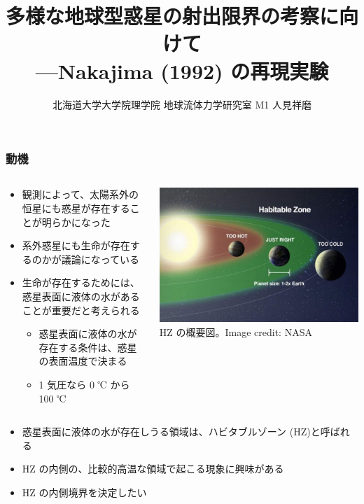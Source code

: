\documentclass[aspectratio=149,9pt]{beamer}
\author{北海道大学大学院理学院 地球流体力学研究室 M1 人見祥磨}
\title{多様な地球型惑星の射出限界の考察に向けて\\---Nakajima \etal (1992) の再現実験}
\begin{document}
\begin{frame}
	\maketitle
\end{frame}

\begin{frame}
	\frametitle{動機}
	\begin{columns}[T,onlytextwidth]
		\begin{column}{.5\textwidth}
			\begin{itemize}
				\item 観測によって、太陽系外の恒星にも惑星が存在することが明らかになった
				\item 系外惑星にも生命が存在するのかが議論になっている
				\item 生命が存在するためには、惑星表面に液体の水があることが重要だと考えられる
					\begin{itemize}
						\item 惑星表面に液体の水が存在する条件は、惑星の表面温度で決まる
						\item 1 気圧なら 0 ℃ から 100 ℃
					\end{itemize}
			\end{itemize}
		\end{column}
		\begin{column}{.45\textwidth}
			\centering
			\includegraphics[width=\textwidth]{hz.jpg}\\
			\scriptsize HZ の概要図。Image credit: NASA
		\end{column}
	\end{columns}
	\begin{itemize}
		\item 惑星表面に液体の水が存在しうる領域は、ハビタブルゾーン (HZ)と呼ばれる
		\item HZ の内側の、比較的高温な領域で起こる現象に興味がある
		\item HZ の内側境界を決定したい
	\end{itemize}
\end{frame}
\end{document}
